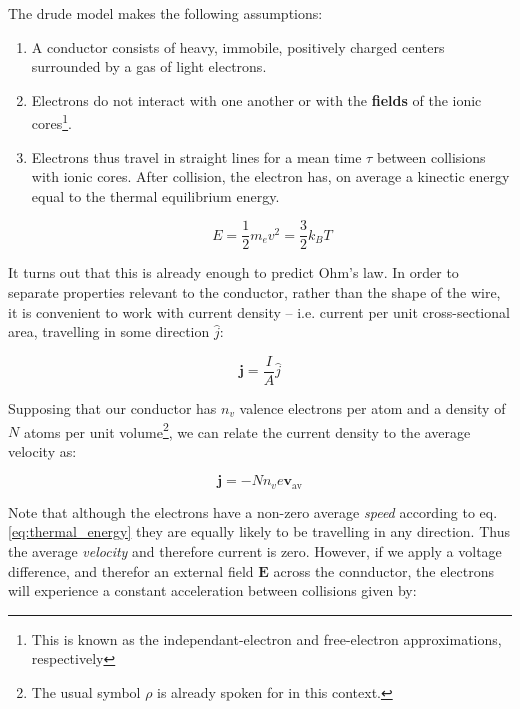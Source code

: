\documentclass{tufte-book}
\begin{document}
The drude model makes the following assumptions:

\begin{enumerate}
  \item A conductor consists of heavy, immobile, positively charged centers surrounded by a gas of light electrons.
  \item Electrons do not interact with one another or with the \textbf{fields} of the ionic cores\footnote{This is known as the independant-electron and free-electron approximations, respectively}.
  \item Electrons thus travel in straight lines for a mean time $\tau$ between collisions with ionic cores. After collision, the electron has, on average a kinectic energy equal to the thermal equilibrium energy.

  \begin{equation}
    \label{eq:thermal_energy}
    E = \frac{1}{2}m_ev^2 = \frac{3}{2}k_BT
  \end{equation}
\end{enumerate}

It turns out that this is already enough to predict Ohm's law. In order to separate properties relevant to the conductor, rather than the shape of the wire, it is convenient to work with current density -- i.e. current per unit cross-sectional area, travelling in some direction $\hat{j}$:

\begin{equation}
\label{eq:current_density}
\textbf{j} = \frac{I}{A}\hat{j}
\end{equation}

Supposing that our conductor has $n_v$ valence electrons per atom and a density of $N$ atoms per unit volume\footnote{The usual symbol $\rho$ is already spoken for in this context.}, we can relate the current density to the average velocity as:

\begin{equation}
\label{eq:current_density_velocity}
\textbf{j} = -Nn_ve\textbf{v}_\text{av}
\end{equation}

Note that although the electrons have a non-zero average \textit{speed} according to eq. \ref{eq:thermal_energy} they are equally likely to be travelling in any direction. Thus the average \textit{velocity} and therefore current is zero. However, if we apply a voltage difference, and therefor an external field $\textbf{E}$ across the connductor, the electrons will experience a constant acceleration between collisions given by:
\end{document}
